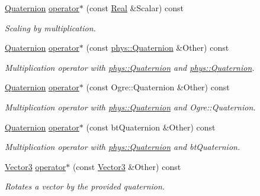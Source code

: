 \begin{DoxyCompactItemize}
\hyperlink{classphys_1_1Quaternion}{Quaternion} \hyperlink{classphys_1_1Quaternion_a8a67c3e05a56a38407f899020c61631d}{operator$\ast$} (const \hyperlink{namespacephys_af7eb897198d265b8e868f45240230d5f}{Real} \&Scalar) const 
\begin{DoxyCompactList}\small\item\em Scaling by multiplication. \item\end{DoxyCompactList}\item 
\hyperlink{classphys_1_1Quaternion}{Quaternion} \hyperlink{classphys_1_1Quaternion_a2b1017fc916a896440a00bee3fd3ca9b}{operator$\ast$} (const \hyperlink{classphys_1_1Quaternion}{phys::Quaternion} \&Other) const 
\begin{DoxyCompactList}\small\item\em Multiplication operator with \hyperlink{classphys_1_1Quaternion}{phys::Quaternion} and \hyperlink{classphys_1_1Quaternion}{phys::Quaternion}. \item\end{DoxyCompactList}\item 
\hyperlink{classphys_1_1Quaternion}{Quaternion} \hyperlink{classphys_1_1Quaternion_ae37df9d07e51739908e05a4bd518c1e1}{operator$\ast$} (const Ogre::Quaternion \&Other) const 
\begin{DoxyCompactList}\small\item\em Multiplication operator with \hyperlink{classphys_1_1Quaternion}{phys::Quaternion} and Ogre::Quaternion. \item\end{DoxyCompactList}\item 
\hyperlink{classphys_1_1Quaternion}{Quaternion} \hyperlink{classphys_1_1Quaternion_abafe5f21ebfac271310905b29da13373}{operator$\ast$} (const btQuaternion \&Other) const 
\begin{DoxyCompactList}\small\item\em Multiplication operator with \hyperlink{classphys_1_1Quaternion}{phys::Quaternion} and btQuaternion. \item\end{DoxyCompactList}\item 
\hyperlink{classphys_1_1Vector3}{Vector3} \hyperlink{classphys_1_1Quaternion_a4e3107c95f94d2b4ddae8c86be9fe28e}{operator$\ast$} (const \hyperlink{classphys_1_1Vector3}{Vector3} \&Other) const 
\begin{DoxyCompactList}\small\item\em Rotates a vector by the provided quaternion. \item\end{DoxyCompactList}\item 

\end{DoxyCompactItemize}

